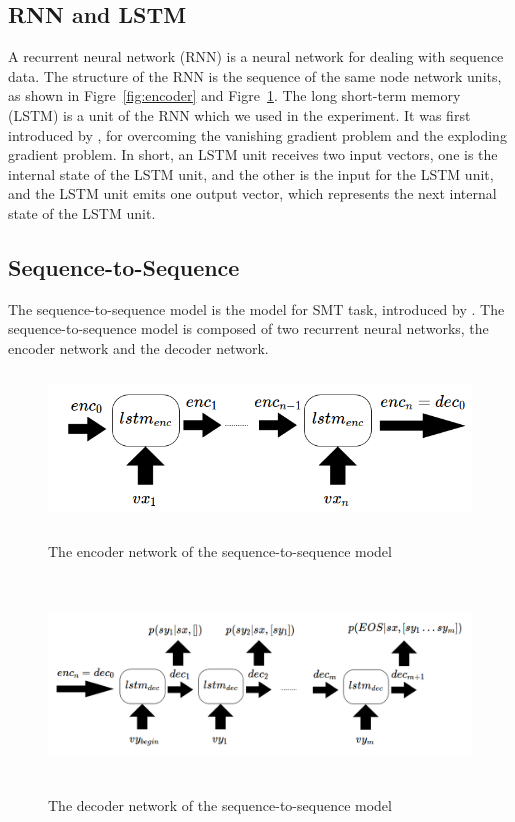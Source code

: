 \documentclass[senior,final,11pt]{iscs-thesis}
\begin{document}
\subsection{RNN and LSTM}
A recurrent neural network (RNN) is a neural network for dealing with sequence data.
The structure of the RNN is the sequence of the same node network units, as shown in Figre~\ref{fig:encoder} and Figre~\ref{fig:decoder}. 
The long short-term memory (LSTM) is a unit of the RNN which we used in the experiment. 
It was first introduced by \sloppy \citet{first_LSTM} , for overcoming the vanishing gradient problem and the exploding gradient problem.
In short, an LSTM unit receives two input vectors, 
one is the internal state of the LSTM unit, and the other is the input for the LSTM unit, 
and the LSTM unit emits one output vector, which represents the next internal state of the LSTM unit.

\subsection{Sequence-to-Sequence}


The sequence-to-sequence model is the model for SMT task, introduced by \citet{seq2seq}.
The sequence-to-sequence model is composed of two recurrent neural networks, the encoder network and the decoder network.

\begin{figure}[]
	\begin{center}
	\includegraphics[height=4cm]{encoder.png}
	\end{center}
	\caption{The encoder network of the sequence-to-sequence model}
	\label{fig:encoder}
	\begin{center}
	\includegraphics[height=5.7cm]{decoder.png}
	\end{center}
	\caption{ The decoder network of the sequence-to-sequence model}
	\label{fig:decoder}
\end{figure}
\end{document}

